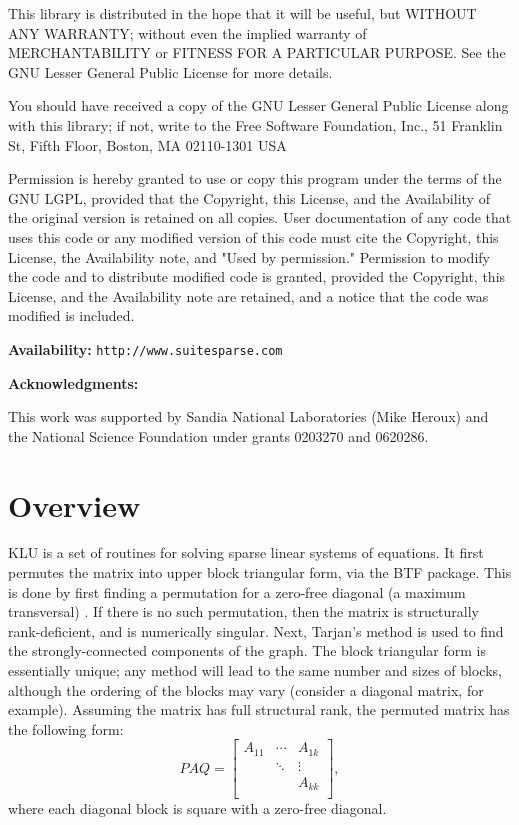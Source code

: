 \documentclass[11pt]{article}
\begin{document}
    This library is distributed in the hope that it will be useful,
    but WITHOUT ANY WARRANTY; without even the implied warranty of
    MERCHANTABILITY or FITNESS FOR A PARTICULAR PURPOSE.  See the GNU
    Lesser General Public License for more details.

    You should have received a copy of the GNU Lesser General Public
    License along with this library; if not, write to the Free Software
    Foundation, Inc., 51 Franklin St, Fifth Floor, Boston, MA  02110-1301
    USA

    Permission is hereby granted to use or copy this program under the
    terms of the GNU LGPL, provided that the Copyright, this License,
    and the Availability of the original version is retained on all copies.
    User documentation of any code that uses this code or any modified
    version of this code must cite the Copyright, this License, the
    Availability note, and "Used by permission." Permission to modify
    the code and to distribute modified code is granted, provided the
    Copyright, this License, and the Availability note are retained,
    and a notice that the code was modified is included.

{\bf Availability:} {\tt http://www.suitesparse.com}

{\bf Acknowledgments:}

    This work was supported by Sandia National Laboratories (Mike Heroux)
    and the National Science Foundation under grants 0203270 and 0620286.


\newpage
\section{Overview}

KLU is a set of routines for solving sparse linear systems of equations.  It
first permutes the matrix into upper block triangular form, via the BTF
package.  This is done by first finding a permutation for a zero-free diagonal
(a maximum transversal) \cite{Duff81}. If there is no such permutation, then
the matrix is structurally rank-deficient, and is numerically singular.  Next,
Tarjan's method \cite{Duff78a,Tarjan72} is used to find the strongly-connected
components of the graph.  The block triangular form is essentially unique; any
method will lead to the same number and sizes of blocks, although the ordering
of the blocks may vary (consider a diagonal matrix, for example).  Assuming the
matrix has full structural rank, the permuted matrix has the following form:
\[
PAQ =
\left[
\begin{array}{ccc}
A_{11} & \cdots & A_{1k} \\
       & \ddots & \vdots \\
       &        & A_{kk} \\
\end{array}
\right],
\]
where each diagonal block is square with a zero-free diagonal.
\end{document}
